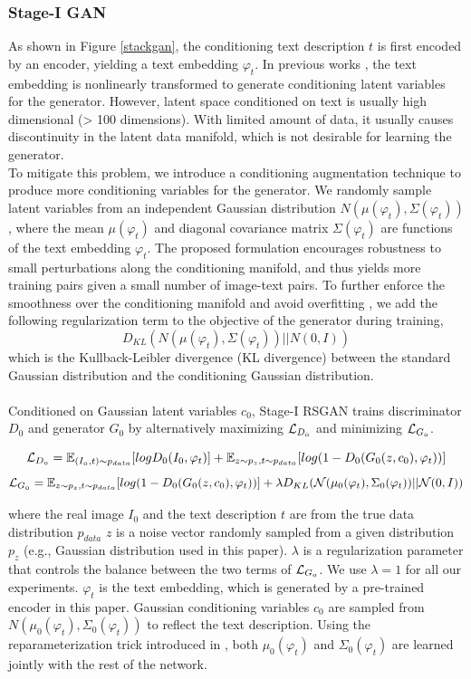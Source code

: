 \documentclass{article}
\begin{document}
\subsubsection{Stage-I GAN}
As shown in Figure \ref{stackgan}, the conditioning text description $t$ is first encoded by an encoder, yielding a text embedding $\varphi_t$. In previous works \cite{bayes2014, learn2016}, the text embedding is nonlinearly transformed to generate conditioning latent variables for the generator. However, latent space conditioned on text is usually high dimensional (> 100 dimensions). With limited amount of data, it usually causes discontinuity in the latent data manifold, which is not desirable for learning the generator.
\\
To mitigate this problem, we introduce a conditioning augmentation technique to produce more conditioning variables for the generator. We randomly sample latent variables from an independent Gaussian distribution $N(\mu(\varphi_t), \Sigma(\varphi_t))$, where the mean $\mu(\varphi_t)$ and diagonal covariance matrix $ \Sigma(\varphi_t)$ are functions of the text embedding $\varphi_t$. The proposed formulation encourages robustness to small perturbations along the conditioning manifold, and thus yields more training pairs given a small number of image-text pairs. To further enforce the smoothness over the conditioning manifold and avoid overfitting \cite{tutorial2016,autoEncod2016}, we add the following regularization term to the objective of the generator during training,
$$D_{KL}( N(\mu(\varphi_t), \Sigma(\varphi_t)) || N(0,I))$$
which is the Kullback-Leibler divergence (KL divergence) between the standard Gaussian distribution and the conditioning Gaussian distribution.
\\\\
Conditioned on Gaussian latent variables $c_0$, {Stage-I RSGAN} trains discriminator $D_0$ and generator $G_0$ by alternatively maximizing $\mathcal{L_\mathnormal{D_0}}$ and minimizing $\mathcal{L_\mathnormal{G_0}}$.

$$\mathcal{L_\mathnormal{D_0}} = \mathbb{E_\mathnormal{(I_0,t) \sim p_{data} }} [log D_0(I_0,\varphi_t)] + \mathbb{E_\mathnormal{z \sim p_z, t \sim p_{data} }} [log (1-D_0(G_0(z,c_0), \varphi_t))]$$
$$\mathcal{L_\mathnormal{G_0}} =  \mathbb{E_\mathnormal{z \sim p_z, t \sim p_{data} }} [log (1-D_0(G_0(z,c_0), \varphi_t))] + \lambda D_{KL} (\mathcal{N}(\mu_0(\varphi_t), \Sigma_0 (\varphi_t)) || \mathcal{N}(0,I))$$

where the real image $I_0$ and the text description $t$ are from the true data distribution $p_{data}$ $z$ is a noise vector randomly sampled from a given distribution $p_z$ (e.g., Gaussian distribution used in this paper). $\lambda$ is a regularization parameter that controls the balance between the two terms of $\mathcal{L_\mathnormal{G_0}}$. We use $\lambda= 1$ for all our experiments. $\varphi_t$ is the text embedding, which is generated by a pre-trained encoder \cite{fineGrain2016} in this paper. Gaussian conditioning variables $c_0$ are sampled from $N(\mu_0(\varphi_t), \Sigma_0(\varphi_t))$ to reflect the text description. Using the reparameterization trick introduced in \cite{autoEncod2014}, both $\mu_0(\varphi_t)$  and $\Sigma_0(\varphi_t)$ are learned jointly with the rest of the network.
\end{document}
